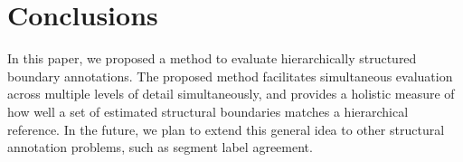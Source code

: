 \documentclass{article}
\begin{document}
\section{Conclusions}\label{sec:conclusions}

In this paper, we proposed a method to evaluate hierarchically structured boundary annotations. 
The proposed method facilitates simultaneous evaluation across multiple levels of detail simultaneously, and provides a holistic measure of how well a set of estimated structural boundaries matches a hierarchical reference. 
In the future, we plan to extend this general idea to other structural annotation problems, such as segment label agreement.


\end{document}
